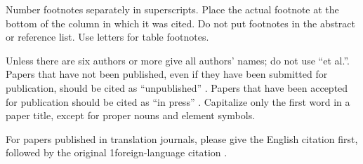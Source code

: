 \documentclass[conference]{IEEEtran}
\begin{document}
Number footnotes separately in superscripts. Place the actual footnote at the bottom of the column in which it was cited. Do not put footnotes in the abstract or reference list. Use letters for table footnotes.

Unless there are six authors or more give all authors' names; do not use ``et al.''. Papers that have not been published, even if they have been submitted for publication, should be cited as ``unpublished'' \cite{aubert97_variat_method_image_recov}. Papers that have been accepted for publication should be cited as ``in press'' \cite{muller55_certain_infin_integ_invol_bessel_funct}. Capitalize only the first word in a paper title, except for proper nouns and element symbols.

For papers published in translation journals, please give the English citation first, followed by the original 1foreign-language citation \cite{muller55_certain_infin_integ_invol_bessel_funct}.



\end{document}
